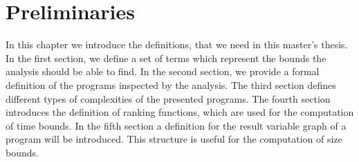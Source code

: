\section{Preliminaries}

In this chapter we introduce the definitions, that we need in this master's thesis.
In the first section, we define a set of terms which represent the bounds the analysis should be able to find. 
In the second section, we provide a formal definition of the programs inspected by the analysis.
The third section defines different types of complexities of the presented programs. 
The fourth section introduces the definition of ranking functions, which are used for the computation of time bounds.
In the fifth section a definition for the result variable graph of a program will be introduced.
This structure is useful for the computation of size bounds.










